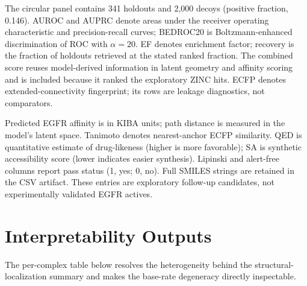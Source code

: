 \documentclass[11pt]{article}
\newenvironment{smalltable}%
{\begin{table}[!htbp]\centering\begingroup\setlength{\tabcolsep}{3pt}\renewcommand{\arraystretch}{1.1}\footnotesize}%
{\endgroup\end{table}}
\begin{document}
\begin{smalltable}
\caption{\textbf{Full EGFR retrieval benchmark, including the exploratory combined path-plus-affinity score.}}
\label{tab:egfr_full_metrics}
\par\vspace{3pt}
\begin{minipage}{\linewidth}\footnotesize\raggedright
The circular panel contains 341 holdouts and 2,000 decoys (positive fraction, 0.146). AUROC and AUPRC denote areas under the receiver operating characteristic and precision-recall curves; BEDROC20 is Boltzmann-enhanced discrimination of ROC with $\alpha = 20$. EF denotes enrichment factor; recovery is the fraction of holdouts retrieved at the stated ranked fraction. The combined score reuses model-derived information in latent geometry and affinity scoring and is included because it ranked the exploratory ZINC hits. ECFP denotes extended-connectivity fingerprint; its rows are leakage diagnostics, not comparators.
\end{minipage}
\end{smalltable}

\begin{smalltable}
\caption{\textbf{Top 10 exploratory ZINC candidates ranked by the combined interpolation and affinity score.}}
\label{tab:egfr_top_hits}
\vspace{3pt}
\begin{minipage}{\linewidth}\footnotesize
Predicted EGFR affinity is in KIBA units; path distance is measured in the model's latent space. Tanimoto denotes nearest-anchor ECFP similarity. QED is quantitative estimate of drug-likeness (higher is more favorable); SA is synthetic accessibility score (lower indicates easier synthesis). Lipinski and alert-free columns report pass status (1, yes; 0, no). Full SMILES strings are retained in the CSV artifact. These entries are exploratory follow-up candidates, not experimentally validated EGFR actives.
\end{minipage}
\end{smalltable}

\section{Interpretability Outputs}
The per-complex table below resolves the heterogeneity behind the structural-localization summary and makes the base-rate degeneracy directly inspectable.
\end{document}
